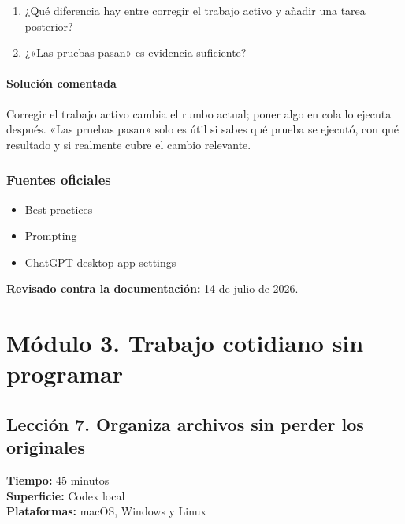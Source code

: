 \documentclass[10pt,a4paper,openany]{book}
\providecommand{\tightlist}{\setlength{\itemsep}{0.18em}\setlength{\parskip}{0pt}}
\begin{document}
\begin{enumerate}
\def\labelenumi{\arabic{enumi}.}
\tightlist
\item
  ¿Qué diferencia hay entre corregir el trabajo activo y añadir una
  tarea posterior?
\item
  ¿«Las pruebas pasan» es evidencia suficiente?
\end{enumerate}

\subsubsection{Solución comentada}\label{soluciuxf3n-comentada-6}

Corregir el trabajo activo cambia el rumbo actual; poner algo en cola lo
ejecuta después. «Las pruebas pasan» solo es útil si sabes qué prueba se
ejecutó, con qué resultado y si realmente cubre el cambio relevante.

\subsection{Fuentes oficiales}\label{fuentes-oficiales-5}

\begin{itemize}
\tightlist
\item
  \href{https://learn.chatgpt.com/guides/best-practices}{Best practices}
\item
  \href{https://learn.chatgpt.com/docs/prompting}{Prompting}
\item
  \href{https://learn.chatgpt.com/docs/reference/settings}{ChatGPT
  desktop app settings}
\end{itemize}

\textbf{Revisado contra la documentación:} 14 de julio de 2026.

\chapter{Módulo 3. Trabajo cotidiano sin
programar}\label{muxf3dulo-3.-trabajo-cotidiano-sin-programar}

\clearpage

\section{Lección 7. Organiza archivos sin perder los
originales}\label{lecciuxf3n-7.-organiza-archivos-sin-perder-los-originales}

\begin{metabox}

\textbf{Tiempo:} 45 minutos\\
\textbf{Superficie:} Codex local\\
\textbf{Plataformas:} macOS, Windows y Linux

\end{metabox}
\end{document}
